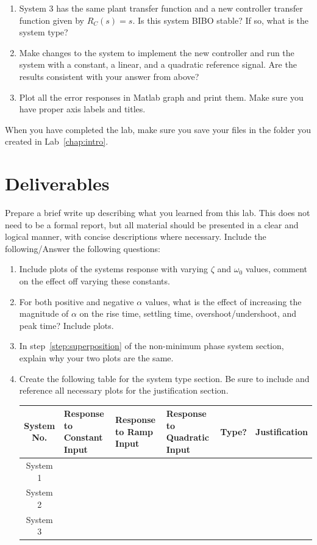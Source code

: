 \begin{enumerate}
\item System 3 has the same plant transfer function and a new
controller transfer function given by $R_{C}(s)=s$\@.  Is this system BIBO
stable?  If so, what is the system type?

\item Make changes to the system to implement the new controller and run the
system with a constant, a linear, and a quadratic reference signal.  Are the
results consistent with your answer from above? 

\item Plot all the error responses in \textsf{Matlab} graph and print them.
Make sure you have proper axis labels and titles.
\end{enumerate}

When you have completed the lab, make sure you save your files in the folder
you created in Lab~\ref{chap:intro}\@.

\section{Deliverables}

Prepare a brief write up describing what you learned from this lab. This does not
need to be a formal report, but all material should be presented in a clear and logical manner,
with concise descriptions where necessary. Include the following/Answer the following questions:
\begin{enumerate}
\item Include plots of the systems response with varying $\zeta$ and $\omega_0$ values, comment 
on the effect off varying these constants. 
\item For both positive and negative $\alpha$ values, what is the effect of increasing the magnitude 
of $\alpha$ on the rise time, settling time, overshoot/undershoot, and peak time? Include plots. 
\item In step~\ref{step:superposition} of the non-minimum phase system section, explain why your two 
plots are the same. 
\item Create the following table for the system type section. Be sure to include and reference all 
necessary plots for the justification section. 
\begin{table}[htbp]\label{tab:systype}
\centering
\begin{tabular}{|c|p{2.5cm}|p{2.5cm}|p{2.5cm}|c|c|}\hline
System No.&Response to Constant Input&Response to Ramp Input&Response to Quadratic Input&
Type?&Justification\\\hline
System 1&&&&&\\\hline
System 2&&&&&\\\hline
System 3&&&&&\\
\hline
\end{tabular}
\end{table}%
\end{enumerate}

